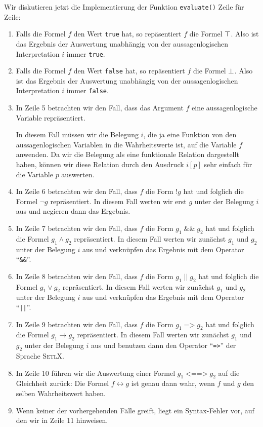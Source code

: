 \noindent
Wir diskutieren jetzt die Implementierung der Funktion \texttt{evaluate()} Zeile f\"{u}r
Zeile:
\begin{enumerate}
\item Falls die Formel $f$ den Wert \texttt{true} hat, so rep\"{a}sentiert $f$ die Formel $\top$.
      Also ist das Ergebnis der Auswertung unabh\"{a}ngig von der aussagenlogischen
      Interpretation $i$ immer \texttt{true}. 
\item Falls die Formel $f$ den Wert \texttt{false} hat, so rep\"{a}sentiert $f$ die Formel
      $\bot$.  Also ist das Ergebnis der
      Auswertung unabh\"{a}ngig von der aussagenlogischen Interpretation $i$ immer \texttt{false}.
\item In Zeile 5 betrachten wir den Fall, dass das Argument $f$ eine aussagenlogische
      Variable repr\"{a}sentiert.   

      In diesem Fall m\"{u}ssen wir die Belegung $i$, die ja eine Funktion
      von den aussagenlogischen Variablen in die Wahrheitswerte ist, auf die Variable $f$
      anwenden.  Da wir die Belegung als eine funktionale Relation dargestellt haben,
      k\"{o}nnen wir diese Relation durch den Ausdruck $i[p]$ sehr einfach f\"{u}r die Variable 
      $p$ auswerten.
\item In Zeile 6 betrachten wir den Fall, dass $f$ die Form $\texttt{!}g$
      hat und folglich die Formel $\neg g$ repr\"{a}sentiert.
      In diesem Fall werten wir erst $g$ unter der Belegung $i$ aus und negieren dann das Ergebnis.
\item In Zeile 7 betrachten wir den Fall, dass $f$ die Form 
      $g_1 \;\texttt{\&\&}\; g_2$ hat und folglich die 
      Formel $g_1 \wedge g_2$ repr\"{a}sentiert.
      In diesem Fall werten wir zun\"{a}chst $g_1$ und $g_2$ unter der Belegung $i$ 
      aus und verkn\"{u}pfen  das Ergebnis mit dem Operator ``\texttt{\&\&}''.
\item In Zeile 8 betrachten wir den Fall, dass $f$ die Form 
      $g_1 \;\texttt{||}\; g_2$ hat und folglich die Formel $g_1 \vee g_2$ repr\"{a}sentiert.
      In diesem Fall werten wir zun\"{a}chst $g_1$ und $g_2$ unter der Belegung $i$ 
      aus und verkn\"{u}pfen  das Ergebnis mit dem Operator ``\texttt{||}''.
\item In Zeile 9 betrachten wir den Fall, dass $f$ die Form 
       $g_1 \;\texttt{=>}\; g_2$ hat und folglich die 
      Formel $g_1 \rightarrow g_2$       repr\"{a}sentiert.
      In diesem Fall werten wir zun\"{a}chst $g_1$ und $g_2$ unter der Belegung $i$ 
      aus und benutzen dann den Operator ``\texttt{=>}'' der Sprache \textsc{SetlX}.
\item In Zeile 10 f\"{u}hren wir die Auswertung einer Formel $g_1 \;\texttt{<==>}\; g_2$
      auf die Gleichheit zur\"{u}ck: Die Formel $f \leftrightarrow g$ ist genau dann wahr,
      wenn $f$ und $g$ den selben Wahrheitswert haben.
\item Wenn keiner der vorhergehenden F\"{a}lle greift, liegt ein Syntax-Fehler vor, 
      auf den wir in Zeile 11 hinweisen.
\end{enumerate}


